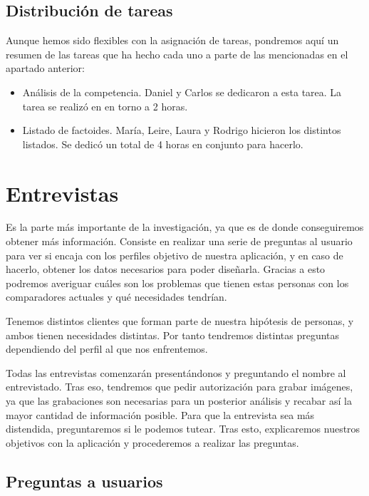 \subsection{Distribución de tareas}

Aunque hemos sido flexibles con la asignación de tareas, pondremos aquí un resumen de las tareas que ha hecho cada uno a parte de las mencionadas en el apartado anterior:

\begin{itemize}
    \item Análisis de la competencia. Daniel y Carlos se dedicaron a esta tarea. La tarea se realizó en en torno a 2 horas.
    \item Listado de factoides. María, Leire, Laura  y Rodrigo hicieron los distintos listados. Se dedicó un total de 4 horas en conjunto para hacerlo.
\end{itemize}

\section{Entrevistas}

Es la parte más importante de la investigación, ya que es de donde conseguiremos obtener más información. Consiste en realizar una serie de preguntas al usuario para
ver si encaja con los perfiles objetivo de nuestra aplicación, y en caso de hacerlo, obtener los datos necesarios para poder diseñarla. Gracias a esto podremos averiguar
cuáles son los problemas que tienen estas personas con los comparadores actuales y qué necesidades tendrían.

Tenemos distintos clientes que forman parte de nuestra hipótesis de personas, y ambos tienen necesidades distintas. Por tanto tendremos distintas preguntas
dependiendo del perfil al que nos enfrentemos.

Todas las entrevistas comenzarán presentándonos y preguntando el nombre al entrevistado. Tras eso, tendremos que pedir autorización para grabar imágenes, ya que las
grabaciones son necesarias para un posterior análisis y recabar así la mayor cantidad de información posible. Para que la entrevista sea más distendida, preguntaremos
si le podemos tutear. Tras esto, explicaremos nuestros objetivos con la aplicación y procederemos a realizar las preguntas.

\subsection{Preguntas a usuarios}

